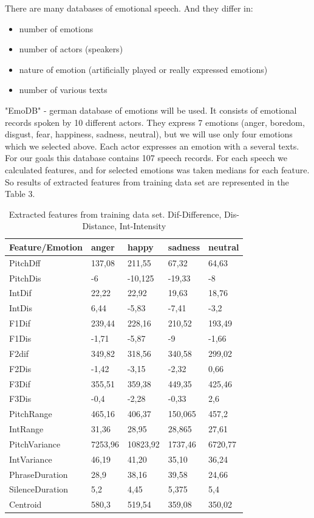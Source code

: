 \documentclass[12pt, letterpaper]{article}
\begin{document}
There are many databases of emotional speech. And they differ in:
\begin{itemize}
	\item number of emotions
	\item number of actors (speakers)
	\item nature of emotion (artificially played or really expressed emotions)
	\item number of various texts
\end{itemize}
"EmoDB"\cite{emodb} - german database of emotions will be used. It consists of emotional records spoken by 10 different actors. They express 7 emotions (anger, boredom, disgust, fear, happiness, sadness, neutral), but we will use only four emotions which we selected above. Each actor expresses an emotion with a several texts. For our goals this database contains 107 speech records. For each speech we calculated features, and for selected emotions was taken medians for each feature. So results of extracted features from training data set are represented in the Table 3.
\begin{table}[h]
	\centering
		\begin{tabular}{l|l|l|l|l|}
			\hline
				Feature/Emotion& anger&	happy	&sadness	&neutral\\ \hline
PitchDff&	137,08	& 211,55	&67,32	&64,63\\ \hline 
PitchDis&	-6	&-10,125&	-19,33&	-8\\ \hline
IntDif&	22,22&	22,92&	19,63&	18,76\\ \hline
IntDis	&6,44	&-5,83&	-7,41&	-3,2\\ \hline
F1Dif&	239,44&	228,16&	210,52&	193,49\\ \hline
F1Dis&	-1,71	&-5,87&	-9&	-1,66\\ \hline
F2dif	&349,82&	318,56&	340,58&	299,02\\ \hline
F2Dis&	-1,42&	-3,15&	-2,32	&0,66\\ \hline
F3Dif&	355,51&	359,38&	449,35&	425,46\\ \hline
F3Dis&	-0,4	&-2,28&	-0,33&	2,6\\ \hline
PitchRange&	465,16&	406,37&	150,065&	457,2\\ \hline
IntRange&	31,36&	28,95&	28,865&	27,61\\ \hline
PitchVariance&	7253,96&	10823,92&	1737,46&	6720,77\\ \hline
IntVariance	&46,19&	41,20&	35,10	&36,24\\ \hline
PhraseDuration&	28,9&	38,16&	39,58	&24,66\\ \hline
SilenceDuration	&5,2	&4,45	&5,375&	5,4\\ \hline
Centroid&	580,3	&519,54&	359,08&	350,02\\ \hline
 \hline
		\end{tabular}
	\caption{Extracted features from training data set. Dif-Difference, Dis-Distance, Int-Intensity}
	\label{tab:ExtractedFeaturesFromTrainingDataSet}
\end{table}
\end{document}
